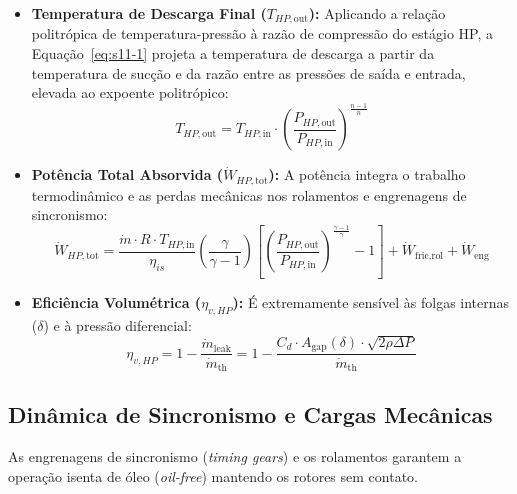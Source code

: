 \documentclass[12pt,a4paper]{article}
\numberwithin{equation}{section}
\numberwithin{table}{section}
\numberwithin{figure}{section}
\begin{document}
	\begin{itemize}
		\item \textbf{Temperatura de Descarga Final ($T_{HP,\text{out}}$):} Aplicando a relação politrópica de temperatura-pressão à razão de compressão do estágio HP, a Equação~\eqref{eq:s11-1} projeta a temperatura de descarga a partir da temperatura de sucção e da razão entre as pressões de saída e entrada, elevada ao expoente politrópico:
		\begin{equation}\label{eq:s11-1}
 T_{HP,\text{out}} = T_{HP,\text{in}} \cdot \left( \frac{P_{HP,\text{out}}}{P_{HP,\text{in}}} \right)^{\frac{n-1}{n}}
\end{equation}
		
		\item \textbf{Potência Total Absorvida ($\dot{W}_{HP,\text{tot}}$):}
		A potência integra o trabalho termodinâmico e as perdas mecânicas nos rolamentos e engrenagens de sincronismo:
		\begin{equation}\label{eq:s11-2}
 \dot{W}_{HP,\text{tot}} = \frac{\dot{m} \cdot R \cdot T_{HP,\text{in}}}{\eta_{is}} \left( \frac{\gamma}{\gamma-1} \right) \left[ \left( \frac{P_{HP,\text{out}}}{P_{HP,\text{in}}} \right)^{\frac{\gamma-1}{\gamma}} - 1 \right] + \dot{W}_{\text{fric,rol}} + \dot{W}_{\text{eng}} 
\end{equation}
		
		\item \textbf{Eficiência Volumétrica ($\eta_{v,HP}$):}
		É extremamente sensível às folgas internas ($\delta$) e à pressão diferencial:
		\begin{equation}\label{eq:s11-3}
 \eta_{v,HP} = 1 - \frac{\dot{m}_{\text{leak}}}{\dot{m}_{\text{th}}} = 1 - \frac{C_d \cdot A_{\text{gap}}(\delta) \cdot \sqrt{2 \rho \Delta P}}{\dot{m}_{\text{th}}} 
\end{equation}
	\end{itemize}
	
	\subsection{\textbf{Dinâmica de Sincronismo e Cargas Mecânicas}}
	As engrenagens de sincronismo (\textit{timing gears}) e os rolamentos garantem a operação isenta de óleo (\textit{oil-free}) mantendo os rotores sem contato.
	
\end{document}
